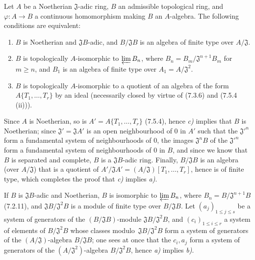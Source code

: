 \begin{proposition}[7.5.5]
\label{0.7.5.5}
Let $A$ be a Noetherian $\mathfrak J$-adic ring, $B$ an admissible topological
ring, and $\varphi:A\to B$ a continuous homomorphism making $B$ an
$A$-algebra. The following conditions are equivalent:
\begin{enumerate}
  \item[a)] $B$ is Noetherian and $\mathfrak JB$-adic, and
  $B/\mathfrak JB$ is an algebra of finite type over $A/\mathfrak J$.

  \item[b)] $B$ is topologically $A$-isomorphic to $\varprojlim B_n$, where
  $B_n=B_m/\mathfrak J^{n+1}B_m$ for $m\geq n$, and $B_1$ is an algebra of
  finite type over $A_1=A/\mathfrak J^2$.

  \item[c)] $B$ is topologically $A$-isomorphic to a quotient of an algebra
  of the form\linebreak $A\{T_1,\ldots,T_r\}$ by an ideal (necessarily closed by virtue
  of \textup{(7.3.6)} and \textup{(7.5.4 (ii))}).
\end{enumerate}
\end{proposition}

Since $A$ is Noetherian, so is
$A'=A\{T_1,\ldots,T_r\}$ (7.5.4), hence \emph{c)} implies that $B$ is Noetherian;
since $\mathfrak J'=\mathfrak JA'$ is an open neighbourhood of 0 in $A'$ such
that the $\mathfrak J'^{n}$ form a fundamental system of neighbourhoods of 0,
the images $\mathfrak J^nB$ of the $\mathfrak J'^{n}$ form a fundamental
system of neighbourhoods of 0 in $B$, and since we know that $B$ is separated and
complete, $B$ is a $\mathfrak JB$-adic ring. Finally, $B/\mathfrak JB$ is
an algebra (over $A/\mathfrak J$) that is a quotient of
$A'/\mathfrak JA'=(A/\mathfrak J)[T_1,\ldots,T_r]$, hence is of finite type, which
completes the proof that \emph{c)} implies \emph{a)}.

If $B$ is $\mathfrak JB$-adic and Noetherian, $B$ is isomorphic to
$\varprojlim B_n$, where $B_n=B/\mathfrak J^{n+1}B$ (7.2.11), and
$\mathfrak JB/\mathfrak J^2B$ is a module of finite type over
$B/\mathfrak JB$. Let $(a_j)_{1\leq j\leq s}$ be a system of generators of the
$(B/\mathfrak JB)$-module $\mathfrak JB/\mathfrak J^2B$, and
$(c_i)_{1\leq i\leq r}$ a system of elements of $B/\mathfrak J^2B$ whose
classes
modulo~$\mathfrak JB/\mathfrak J^2B$ form a system of generators of the
$(A/\mathfrak J)$-algebra $B/\mathfrak JB$; one sees at once that the $c_i,a_j$
form a system of generators of the $(A/\mathfrak J^2)$-algebra
$B/\mathfrak J^2B$, hence \emph{a)} implies \emph{b)}.

